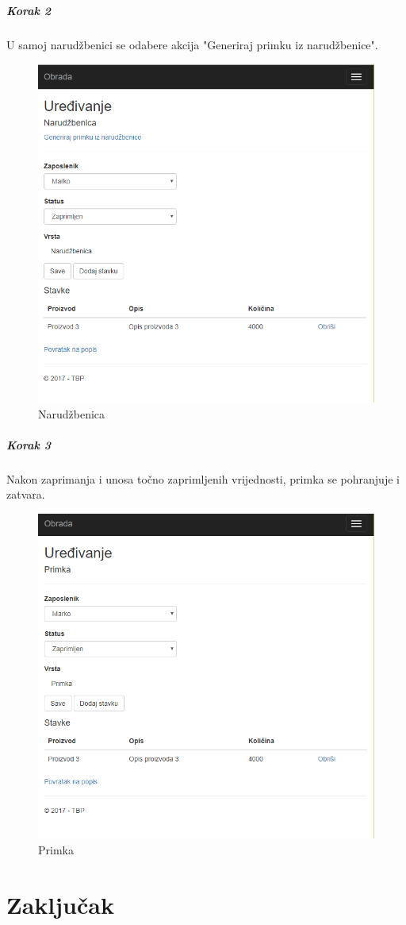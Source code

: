 \documentclass[a4paper,12pt]{foi}
\begin{document}
\paragraph{Korak 2}
U samoj narudžbenici se odabere akcija "Generiraj primku iz narudžbenice".

\begin{figure}[h]
\centering 
\includegraphics[height=0.50\textwidth]{dokument_narudzbenica.png}
\caption{Narudžbenica}
\label{slika-8}
\end{figure}

\paragraph{Korak 3}
Nakon zaprimanja i unosa točno zaprimljenih vrijednosti, primka se pohranjuje i zatvara.

\begin{figure}[h]
\centering 
\includegraphics[height=0.50\textwidth]{dokument_primka.png}
\caption{Primka}
\label{slika-9}
\end{figure}

\chapter{Zaključak}
\end{document}
